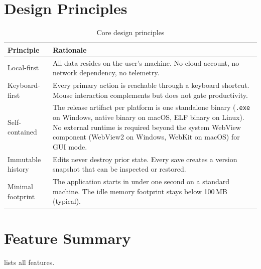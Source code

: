 \documentclass[a4paper, 11pt, oneside]{report}
\begin{document}
\section{Design Principles}
\label{sec:design-principles}

\begin{table}[H]
  \centering
  \caption{Core design principles}
  \label{tab:principles}
  \begin{tabularx}{\textwidth}{l X}
    \toprule
    \textbf{Principle} & \textbf{Rationale} \\
    \midrule
    Local-first       & All data resides on the user's machine.  No cloud
                        account, no network dependency, no telemetry. \\
    Keyboard-first    & Every primary action is reachable through a keyboard
                        shortcut.  Mouse interaction complements but does
                        not gate productivity. \\
    Self-contained    & The release artifact per platform is one
                        standalone binary (\texttt{.exe} on Windows,
                        native binary on macOS, ELF binary on Linux).
                        No external runtime is required beyond the system
                        WebView component (WebView2 on Windows, WebKit
                        on macOS) for GUI mode. \\
    Immutable history & Edits never destroy prior state.  Every save creates
                        a version snapshot that can be inspected or
                        restored. \\
    Minimal footprint & The application starts in under one second on a
                        standard machine.  The idle memory footprint stays
                        below 100\,MB (typical). \\
    \bottomrule
  \end{tabularx}
\end{table}

\section{Feature Summary}
\label{sec:feature-summary}

 lists all features.
\end{document}
